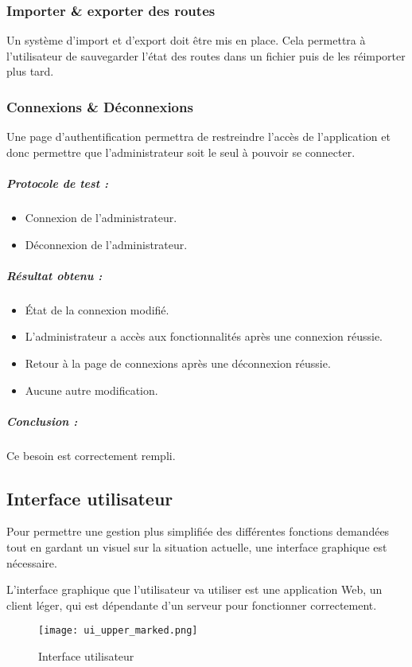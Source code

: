 \subsubsection{Importer \& exporter des routes}
Un système d'import et d'export doit être mis en place. Cela permettra à l'utilisateur de sauvegarder l'état des routes dans un fichier puis de les réimporter plus tard.

\subsubsection{Connexions \& Déconnexions}
Une page d'authentification permettra de restreindre l'accès de l'application et donc permettre que l'administrateur soit le seul à pouvoir se connecter.
\subparagraph{Protocole de test :}
\begin{itemize}
    \item Connexion de l'administrateur.
    \item Déconnexion de l'administrateur.
\end{itemize}
\subparagraph{Résultat obtenu :}
    \begin{itemize}
    \item État de la connexion modifié.
    \item L'administrateur a accès aux fonctionnalités après une connexion réussie.
    \item Retour à la page de connexions après une déconnexion réussie.
    \item Aucune autre modification.
\end{itemize}
\subparagraph{Conclusion :}Ce besoin est correctement rempli.

\subsection{Interface utilisateur}
\label{sssec:ui}

Pour permettre une gestion plus simplifiée des différentes fonctions demandées tout en gardant un visuel sur la situation actuelle, une interface graphique est nécessaire.

L'interface graphique que l'utilisateur va utiliser est une application Web, un client léger, qui est dépendante d'un serveur pour fonctionner correctement.\newline

\begin{figure}[H]
    \texttt{[image: ui\_upper\_marked.png]}
    \caption{Interface utilisateur}
    \label{fig:ui_upper}
\end{figure}

